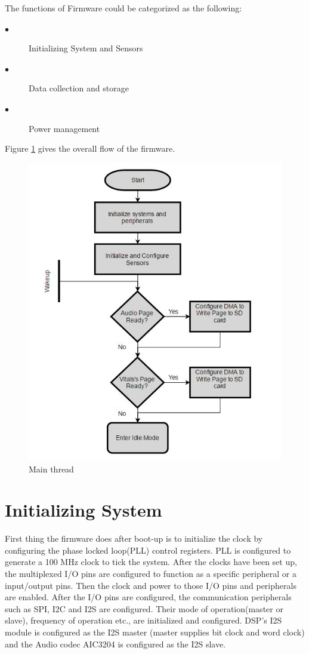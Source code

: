 The functions of Firmware could be categorized as the following:
 \begin{description}
 	\item[$\bullet$]
Initializing System and Sensors 
 	\item[$\bullet$]
Data collection and storage
 	\item[$\bullet$]  
Power management 
 \end{description}
Figure \ref{main} gives the overall flow of the firmware.
 \begin{figure}[h]
	\centering
	\includegraphics[scale = 1 ]{main.JPG}
	\caption{Main thread\label{main}}
\end{figure}

\section{Initializing System}
First thing the firmware does after boot-up is to initialize the clock by configuring the  phase locked loop(PLL) control registers. PLL is configured to generate a 100 MHz clock to tick the system. After the clocks have been set up, the multiplexed I/O pins are configured to function as a specific peripheral or a input/output pins. Then the clock and power to those I/O pins and peripherals are enabled. After the I/O pins are configured, the communication peripherals such as SPI, I2C and I2S are configured. Their mode of operation(master or slave), frequency of operation etc., are initialized and configured. DSP's I2S module is configured as the I2S master (master supplies bit clock and word clock) and the Audio codec AIC3204 is configured as the I2S slave. 

